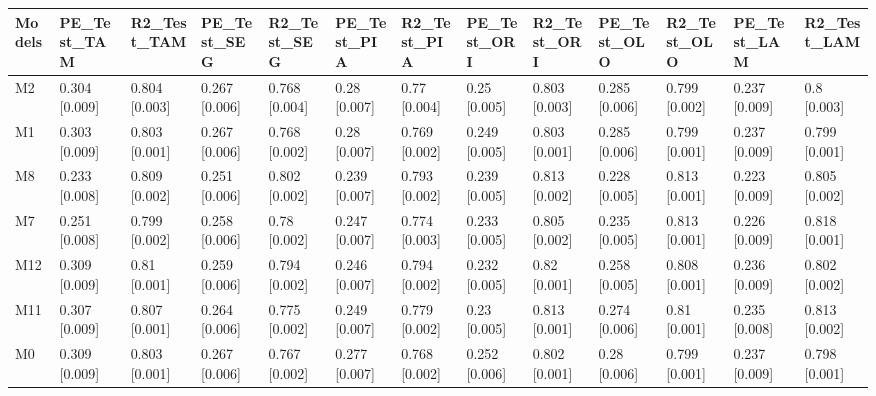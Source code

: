 \begin{table}[ht]
\centering
\begin{tabular}{lllllllllllll}
  \hline
Models & PE\_Test\_TAM & R2\_Test\_TAM & PE\_Test\_SEG & R2\_Test\_SEG & PE\_Test\_PIA & R2\_Test\_PIA & PE\_Test\_ORI & R2\_Test\_ORI & PE\_Test\_OLO & R2\_Test\_OLO & PE\_Test\_LAM & R2\_Test\_LAM \\ 
  \hline
M2 & 0.304 [0.009] & 0.804 [0.003] & 0.267 [0.006] & 0.768 [0.004] & 0.28 [0.007] & 0.77 [0.004] & 0.25 [0.005] & 0.803 [0.003] & 0.285 [0.006] & 0.799 [0.002] & 0.237 [0.009] & 0.8 [0.003] \\ 
  M1 & 0.303 [0.009] & 0.803 [0.001] & 0.267 [0.006] & 0.768 [0.002] & 0.28 [0.007] & 0.769 [0.002] & 0.249 [0.005] & 0.803 [0.001] & 0.285 [0.006] & 0.799 [0.001] & 0.237 [0.009] & 0.799 [0.001] \\ 
  M8 & 0.233 [0.008] & 0.809 [0.002] & 0.251 [0.006] & 0.802 [0.002] & 0.239 [0.007] & 0.793 [0.002] & 0.239 [0.005] & 0.813 [0.002] & 0.228 [0.005] & 0.813 [0.001] & 0.223 [0.009] & 0.805 [0.002] \\ 
  M7 & 0.251 [0.008] & 0.799 [0.002] & 0.258 [0.006] & 0.78 [0.002] & 0.247 [0.007] & 0.774 [0.003] & 0.233 [0.005] & 0.805 [0.002] & 0.235 [0.005] & 0.813 [0.001] & 0.226 [0.009] & 0.818 [0.001] \\ 
  M12 & 0.309 [0.009] & 0.81 [0.001] & 0.259 [0.006] & 0.794 [0.002] & 0.246 [0.007] & 0.794 [0.002] & 0.232 [0.005] & 0.82 [0.001] & 0.258 [0.005] & 0.808 [0.001] & 0.236 [0.009] & 0.802 [0.002] \\ 
  M11 & 0.307 [0.009] & 0.807 [0.001] & 0.264 [0.006] & 0.775 [0.002] & 0.249 [0.007] & 0.779 [0.002] & 0.23 [0.005] & 0.813 [0.001] & 0.274 [0.006] & 0.81 [0.001] & 0.235 [0.008] & 0.813 [0.002] \\ 
  M0 & 0.309 [0.009] & 0.803 [0.001] & 0.267 [0.006] & 0.767 [0.002] & 0.277 [0.007] & 0.768 [0.002] & 0.252 [0.006] & 0.802 [0.001] & 0.28 [0.006] & 0.799 [0.001] & 0.237 [0.009] & 0.798 [0.001] \\ 
   \hline
\end{tabular}
\end{table}
